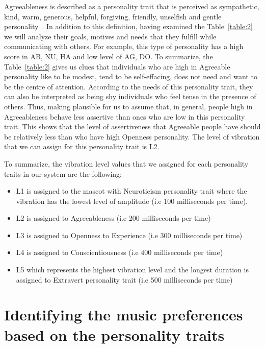 Agreeableness is described as a personality trait that is perceived as sympathetic,
kind, warm, generous, helpful, forgiving, friendly, unselfish and gentle personality~\cite{matthews2003personality}.
In addition to this definition, having examined the Table~\ref{table:2} we will
analyze their goals, motives and needs that they fulfill while communicating with others.
For example, this type of personality has a high score in AB, NU, HA and low level
of AG, DO. To summarize, the Table~\ref{table:2} gives us clues that individuals who
are high in Agreeable personality like to be modest, tend to be self-effacing,
does not need and want to be the centre of attention.
According to the needs of this personality trait, they can also be interpreted as
being shy individuals who feel tense in the presence of others.
Thus, making plausible for us to assume that, in general, people high in Agreeableness
behave less assertive than ones who are low in this personality trait.
This shows that the level of assertiveness that Agreeable people have should be
relatively less than who have high Openness personality.
The level of vibration that we can assign for this personality trait is L2.

To summarize, the vibration level values that we assigned for each personality traits in our system are the following:
\begin{itemize}
\item L1 is assigned to the mascot with Neuroticism personality trait where the
      vibration has the lowest level of amplitude (i.e 100 milliseconds per time).
\item L2 is assigned to Agreeableness (i.e 200 milliseconds per time)
\item L3 is assigned to Openness to Experience (i.e 300 milliseconds per time)
\item L4 is assigned to Conscientiousness (i.e 400 milliseconds per time)
\item L5 which represents the highest vibration level and the longest duration
      is assigned to Extravert personality trait (i.e 500 milliseconds per time)
\end{itemize}



\section{Identifying the music preferences based on the personality traits}
\label{sec:Identifying the music preferences based on the personality traits}

